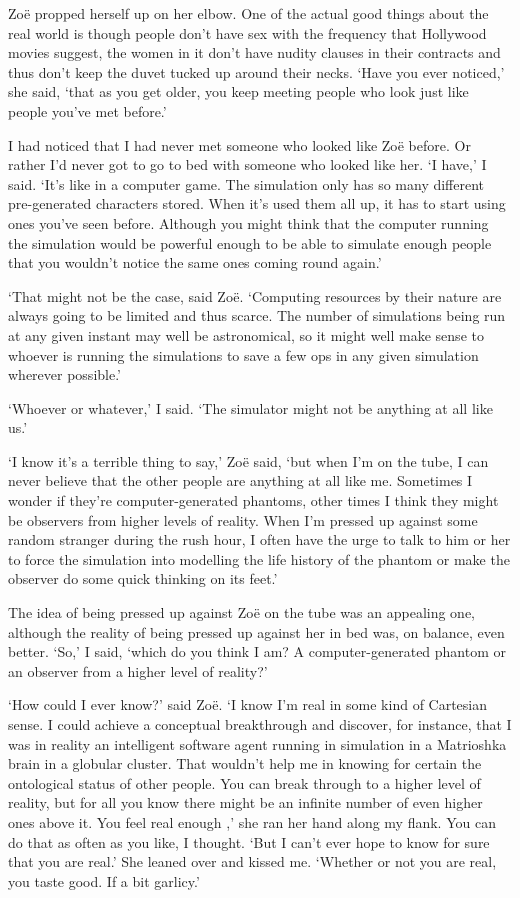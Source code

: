 Zoë propped herself up on her elbow. One of the actual good things
about the real world is though people don't have sex with the
frequency that Hollywood movies suggest, the women in it don't have
nudity clauses in their contracts and thus don't keep the duvet
tucked up around their necks. `Have you ever noticed,' she said,
`that as you get older, you keep meeting people who look just like
people you've met before.'

I had noticed that I had never met someone who looked like Zoë
before. Or rather I'd never got to go to bed with someone who looked
like her. `I have,' I said. `It's like in a computer game. The
simulation only has so many different pre-generated characters
stored. When it's used them all up, it has to start using ones
you've seen before. Although you might think that the computer
running the simulation would be powerful enough to be able to
simulate enough people that you wouldn't notice the same ones coming
round again.'

`That might not be the case, said Zoë. `Computing resources by their nature
are always going to be limited and thus scarce. The number of
simulations being run at any given instant may well be
astronomical, so it might well make sense to whoever is running the
simulations to save a few ops in any given simulation wherever
possible.'

`Whoever or {\twelveit whatever},' I said. `The simulator might not
be anything at all like us.'

`I know it's a terrible thing to say,' Zoë said, `but when I'm
on the tube, I can never believe that the other people are anything
at all like me. Sometimes I wonder if they're computer-generated
phantoms, other times I think they might be observers from higher
levels of reality. When I'm pressed up against some random stranger
during the rush hour, I often have the urge to talk to him or her to
force the simulation into modelling the life history of the phantom
or make the observer do some quick thinking on its feet.'

The idea of being pressed up against Zoë on the tube was an
appealing one, although the reality of being pressed up against her
in bed was, on balance, even better. `So,' I said, `which do you
think I am? A computer-generated phantom or an observer from a
higher level of reality?'

`How could I ever know?' said Zoë. `I know I'm real in some kind
of Cartesian sense. I could achieve a conceptual breakthrough and
discover, for instance, that I was in reality an intelligent software
agent running in simulation in a Matrioshka brain in a globular
cluster. That wouldn't help me in knowing for
certain the ontological status of other people. You can break
through to a higher level of reality, but for all you know there
might be an infinite number of even higher ones above it. You {\twelveit feel\/} real enough ,' she ran her hand along
my flank. You can do that as often as you like, I thought. `But I
can't ever hope to know for sure that you are real.' She leaned over
and kissed me. `Whether or not you are real, you taste good. If
a bit garlicy.'


